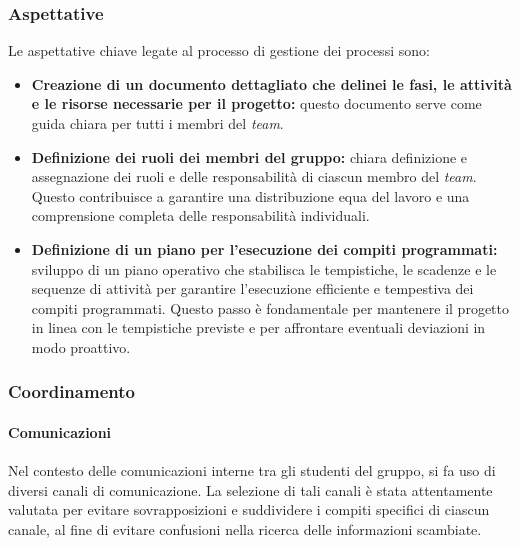 \documentclass[5pt]{article}
\begin{document}
\subsubsection{Aspettative}
Le aspettative chiave legate al processo di gestione dei processi sono:
\begin{itemize}
    \item \textbf{Creazione di un documento dettagliato che delinei le fasi, le attività e le risorse necessarie per il progetto:} questo documento serve come guida chiara per tutti i membri del \textit{team}.
    \item \textbf{Definizione dei ruoli dei membri del gruppo:} chiara definizione e assegnazione dei ruoli e delle responsabilità di ciascun membro del \textit{team}. Questo contribuisce a garantire una distribuzione equa del lavoro e una comprensione completa delle responsabilità individuali.
    \item \textbf{Definizione di un piano per l'esecuzione dei compiti programmati:} sviluppo di un piano operativo che stabilisca le tempistiche, le scadenze e le sequenze di attività per garantire l'esecuzione efficiente e tempestiva dei compiti programmati. Questo passo è fondamentale per mantenere il progetto in linea con le tempistiche previste e per affrontare eventuali deviazioni in modo proattivo.
\end{itemize}

\subsubsection{Coordinamento}
\paragraph{Comunicazioni}
Nel contesto delle comunicazioni interne tra gli studenti del gruppo, si fa uso di diversi canali di comunicazione. La selezione di tali canali è stata attentamente valutata per evitare sovrapposizioni e suddividere i compiti specifici di ciascun canale, al fine di evitare confusioni nella ricerca delle informazioni scambiate.
\end{document}
